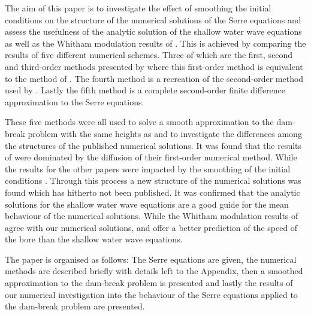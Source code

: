 \documentclass[times]{elsarticle}
\begin{document}
The aim of this paper is to investigate the effect of smoothing the initial conditions on the structure of the numerical solutions of the Serre equations and assess the usefulness of the analytic solution of the shallow water wave equations as well as the Whitham modulation results of \citet{El-etal-2006}. This is achieved by comparing the results of five different numerical schemes. Three of which are the first, second and third-order methods presented by \citet{Zoppou-etal-2017} where this first-order method is equivalent to the method of \citet{Hank-etal-2010-2034}. The fourth method is a recreation of the second-order method used by \citet{El-etal-2006}. Lastly the fifth method is a complete second-order finite difference approximation to the Serre equations. 

These five methods were all used to solve a smooth approximation to the dam-break problem with the same heights as \citet{El-etal-2006} and \citet{Hank-etal-2010-2034} to investigate the differences among the structures of the published numerical solutions. It was found that the results of \cite{Hank-etal-2010-2034} were dominated by the diffusion of their first-order numerical method. While the results for the other papers were impacted by the smoothing of the initial conditions \cite{El-etal-2006,Mitsotakis-etal-2014,Mitsotakis-etal-2017}. Through this process a new structure of the numerical solutions was found which has hitherto not been published. It was confirmed that the analytic solutions for the shallow water wave equations are a good guide for the mean behaviour of the numerical solutions. While the Whitham modulation results of \citet{El-etal-2006} agree with our numerical solutions, and offer a better prediction of the speed of the bore than the shallow water wave equations.   

The paper is organised as follows: The Serre equations are given, the numerical methods are described briefly with details left to the Appendix, then a smoothed approximation to the dam-break problem is presented and lastly the results of our numerical investigation into the behaviour of the Serre equations applied to the dam-break problem are presented. 

\end{document}
